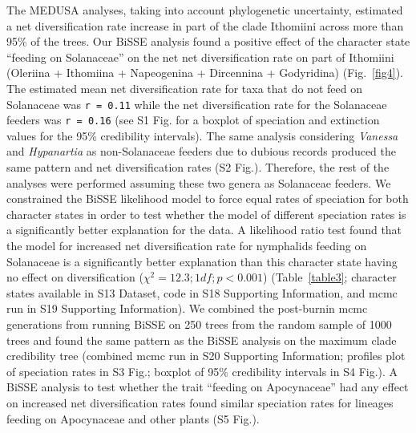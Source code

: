 \documentclass[10pt,letterpaper]{article}
\begin{document}
The MEDUSA analyses, taking into account phylogenetic uncertainty,
estimated a net diversification rate increase in part of the clade
Ithomiini across more than 95\% of the trees. Our BiSSE analysis found a
positive effect of the character state ``feeding on Solanaceae'' on the
net net diversification rate on part of Ithomiini (Oleriina + Ithomiina
+ Napeogenina + Dircennina + Godyridina) (Fig.~\ref{fig4}). The estimated mean
net diversification rate for taxa that do not feed on Solanaceae was
\texttt{r = 0.11} while the net diversification rate for the Solanaceae
feeders was \texttt{r = 0.16} (see S1 Fig. for a boxplot of speciation
and extinction values for the 95\% credibility intervals). The same
analysis considering \emph{Vanessa} and \emph{Hypanartia} as
non-Solanaceae feeders due to dubious records produced the same pattern
and net diversification rates (S2 Fig.). Therefore, the rest of the
analyses were performed assuming these two genera as Solanaceae feeders.
We constrained the BiSSE likelihood model to force equal rates of
speciation for both character states in order to test whether the model
of different speciation rates is a significantly better explanation for
the data. A likelihood ratio test found that the model for increased net
diversification rate for nymphalids feeding on Solanaceae is a
significantly better explanation than this character state having no
effect on diversification (\(\chi^2 = 12.3; 1 df; p < 0.001\))
(Table~\ref{table3};
character states available in S13 Dataset, code in S18 Supporting Information,
and mcmc run in S19 Supporting Information). We combined the post-burnin mcmc generations
from running BiSSE on 250 trees from the random sample of 1000 trees and
found the same pattern as the BiSSE analysis on the maximum clade
credibility tree (combined mcmc run in S20 Supporting Information; profiles
plot of speciation rates in S3 Fig.; boxplot of 95\% credibility intervals in
S4 Fig.). A BiSSE analysis to test whether the trait ``feeding on
Apocynaceae'' had any effect on increased net diversification rates
found similar speciation rates for lineages feeding on Apocynaceae and
other plants (S5 Fig.).
\end{document}
